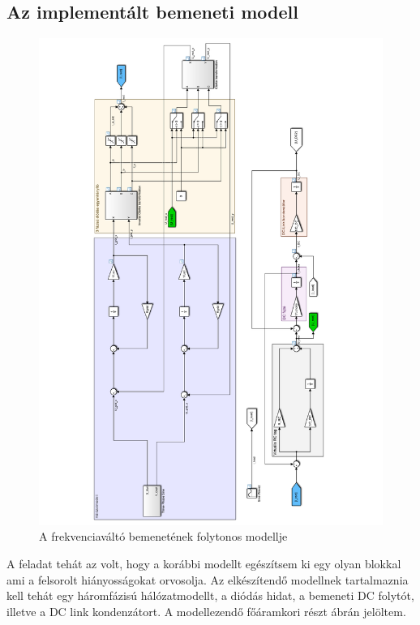 \subsection{Az implementált bemeneti modell}

\begin{figure}[]
	\centering
	\includegraphics[width = 1.2\textwidth]{figures/model_continous.pdf}
	\caption{A frekvenciaváltó bemenetének folytonos modellje} 
	\label{fig:cont_input_model}
\end{figure}

A feladat tehát az volt, hogy a korábbi modellt egészítsem ki egy olyan blokkal ami a felsorolt hiányosságokat orvosolja. Az elkészítendő modellnek tartalmaznia kell tehát egy háromfázisú hálózatmodellt, a diódás hidat, a bemeneti DC folytót, illetve a DC link kondenzátort. A modellezendő főáramkori részt  ábrán jelöltem. 


